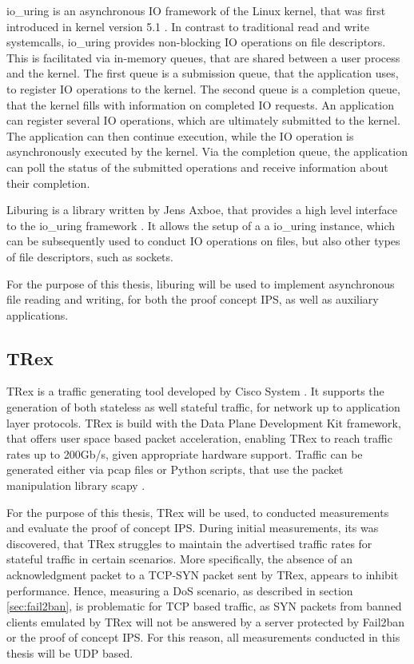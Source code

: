 io\_uring is an asynchronous \ac{IO} framework of the Linux kernel, that was first introduced in kernel version 5.1 \cite{io_uring}.
In contrast to traditional read and write systemcalls, io\_uring provides non-blocking \ac{IO} operations on
file descriptors. This is facilitated via in-memory queues, that are shared between a user process and the kernel.
The first queue is a submission queue, that the application uses, to register \ac{IO} operations to the
kernel. The second queue is a completion queue, that the kernel fills with information on completed \ac{IO} requests.
An application can register several \ac{IO} operations, which are ultimately submitted to the kernel.
The application can then continue execution, while the \ac{IO} operation is asynchronously executed by the kernel.
Via the completion queue, the application can poll the status of the submitted operations
and receive information about their completion.        
\par
Liburing is a library written by Jens Axboe, that provides a high level interface to the io\_uring framework \cite{liburing}.
It allows the setup of a a io\_uring instance, which can be subsequently used to conduct \ac{IO} operations
on files, but also other types of file descriptors, such as sockets.
\par
For the purpose of this thesis, liburing will be used to implement asynchronous file reading and writing,
for both the proof concept \ac{IPS}, as well as auxiliary applications. 

\subsection{TRex} \label{sec:trex}

TRex is a traffic generating tool developed by Cisco System \cite{trex}. It supports the generation of both
stateless as well stateful traffic, for network up to application layer protocols. TRex is build with the Data Plane Development Kit framework,
that offers user space based packet acceleration, enabling TRex to reach traffic rates up to 200Gb/s, given appropriate hardware support. 
Traffic can be generated either via pcap files or Python scripts, that use the packet manipulation library scapy \cite{scapy}.
\par 
For the purpose of this thesis, TRex will be used, to conducted measurements and evaluate the proof of concept \ac{IPS}.
During initial measurements, its was discovered, that TRex struggles to maintain the advertised traffic rates for stateful traffic in certain scenarios.
More specifically, the absence of an acknowledgment packet to a \ac{TCP}-SYN packet sent by TRex, appears to inhibit performance.
Hence, measuring a \ac{DoS} scenario, as described in section \ref{sec:fail2ban}, is problematic for \ac{TCP} based traffic, as SYN packets from banned clients
emulated by TRex will not be answered by a server protected by Fail2ban or the proof of concept \ac{IPS}. For this reason, all measurements conducted in this
thesis will be \ac{UDP} based.

